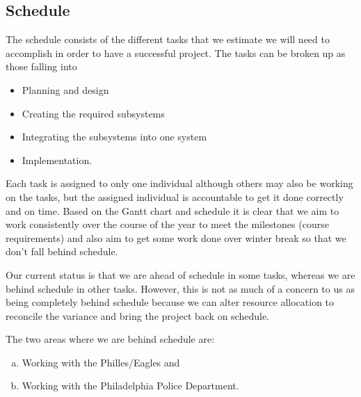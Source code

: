 \documentclass[draft,12pt,titlepage]{article}
\begin{document}
\addtocounter{subsection}{1} %

\subsection{Schedule}
The schedule consists of the different tasks that we estimate we will need to accomplish in
order to have a successful project. The tasks can be broken up as those falling into

\begin{itemize}
  \item Planning and design
  \item Creating the required subsystems
  \item Integrating the subsystems into one system
  \item Implementation.
\end{itemize}

Each task is assigned to only one individual although others may also be working on the
tasks, but the assigned individual is accountable to get it done correctly and on time. Based
on the Gantt chart and schedule it is clear that we aim to work consistently over the course of
the year to meet the milestones (course requirements) and also aim to get some work done
over winter break so that we don’t fall behind schedule.

Our current status is that we are ahead of schedule in some tasks, whereas we are behind
schedule in other tasks. However, this is not as much of a concern to us as being completely
behind schedule because we can alter resource allocation to reconcile the variance and bring
the project back on schedule.

The two areas where we are behind schedule are:

\begin{enumerate}[(a)]
  \item Working with the Philles/Eagles and
  \item Working with the Philadelphia Police Department.
\end{enumerate}
\end{document}
